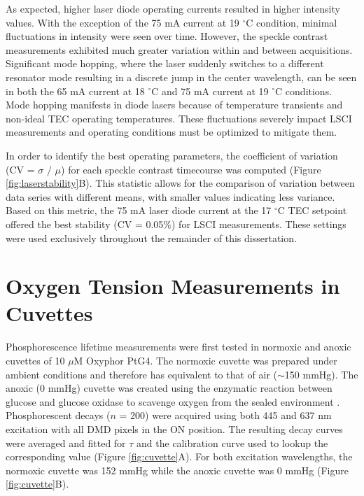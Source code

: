 As expected, higher laser diode operating currents resulted in higher intensity values. With the exception of the 75 mA current at 19 $^\circ$C condition, minimal fluctuations in intensity were seen over time. However, the speckle contrast measurements exhibited much greater variation within and between acquisitions. Significant mode hopping, where the laser suddenly switches to a different resonator mode resulting in a discrete jump in the center wavelength, can be seen in both the 65 mA current at 18 $^\circ$C and 75 mA current at 19 $^\circ$C conditions. Mode hopping manifests in diode lasers because of temperature transients and non-ideal TEC operating temperatures. These fluctuations severely impact LSCI measurements and operating conditions must be optimized to mitigate them.

In order to identify the best operating parameters, the coefficient of variation (CV = $\sigma$ / $\mu$) for each speckle contrast timecourse was computed (Figure \ref{fig:laserstability}B). This statistic allows for the comparison of variation between data series with different means, with smaller values indicating less variance. Based on this metric, the 75 mA laser diode current at the 17 $^\circ$C TEC setpoint offered the best stability (CV = 0.05\%) for LSCI measurements. These settings were used exclusively throughout the remainder of this dissertation.



\section{Oxygen Tension Measurements in Cuvettes}

Phosphorescence lifetime measurements were first tested in normoxic and anoxic cuvettes of 10 $\mu$M Oxyphor PtG4. The normoxic cuvette was prepared under ambient conditions and therefore has  equivalent to that of air ($\sim$150 mmHg). The anoxic (0 mmHg) cuvette was created using the enzymatic reaction between glucose and glucose oxidase to scavenge oxygen from the sealed environment \cite{Lo:1997he}. Phosphorescent decays ($n$ = 200) were acquired using both 445 and 637 nm excitation with all DMD pixels in the ON position. The resulting decay curves were averaged and fitted for $\tau$ and the calibration curve used to lookup the corresponding  value (Figure \ref{fig:cuvette}A). For both excitation wavelengths, the normoxic cuvette  was 152 mmHg while the anoxic cuvette  was 0 mmHg (Figure \ref{fig:cuvette}B).

